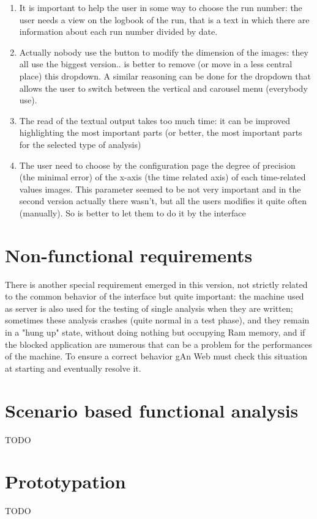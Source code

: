 \begin{enumerate}
\item 
It is important to help the user in some way to choose the run number: the user needs a view on the logbook of the run, that is a text in which there are information about each run number divided by date.

\item
Actually nobody use the button to modify the dimension of the images: they all use the biggest version.. is better to remove (or move in a less central place) this dropdown. A similar reasoning can be done for the dropdown that allows the user to switch between the vertical and carousel menu (everybody use).

\item
The read of the textual output takes too much time: it can be improved highlighting the most important parts (or better, the most important parts for the selected type of analysis)

\item
The user need to choose by the configuration page the degree of precision (the minimal error) of the x-axis (the time related axis) of each time-related values images. This parameter seemed to be not very important and in the second version actually there wasn't, but all the users modifies it quite often (manually). So is better to let them to do it by the interface

\end{enumerate}

\section{Non-functional requirements}

There is another special requirement emerged in this version, not strictly related to the common behavior of the interface but quite important: the machine  used as server is also used for the testing of single analysis when they are written; sometimes these analysis crashes (quite normal in a test phase), and they remain in a "hung up" state, without doing nothing but occupying Ram memory, and if the blocked application are numerous that can be a problem for the performances of the machine. To ensure a correct behavior gAn Web must check this situation at starting and eventually resolve it.

\section{Scenario based functional analysis}
TODO

\section{Prototypation}
TODO 